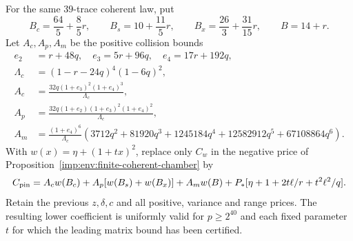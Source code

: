 \begin{proposition}
\label{imp:env:coherent-single-pin}
For the same $39$-trace coherent law, put
\[
 B_c=\frac{64}5+\frac85r,\qquad
 B_s=10+\frac{11}5r,\qquad
 B_x=\frac{26}3+\frac{31}{15}r,\qquad B=14+r.
\]
Let $A_c,A_p,A_m$ be the positive collision bounds
\[
\begin{split}
 e_2&=r+48q,\quad e_3=5r+96q,\quad e_4=17r+192q,\\
 \Lambda_c&=(1-r-24q)^4(1-6q)^2,\\
 A_c&=\frac{32q(1+e_3)^2(1+e_4)^3}{\Lambda_c},\\
 A_p&=\frac{32q(1+e_2)(1+e_3)^2(1+e_4)^2}{\Lambda_c},\\
 A_m&=\frac{(1+e_4)^6}{\Lambda_c}
 (3712q^2+81920q^3+1245184q^4+12582912q^5+67108864q^6).
\end{split}
\]
With $w(x)=\eta+(1+tx)^2$, replace only $C_w$ in the negative
price of Proposition~\ref{imp:env:finite-coherent-chamber} by
\[
 C_{\rm pin}=A_cw(B_c)+A_p[w(B_s)+w(B_x)]+A_mw(B)
 +P_*[\eta+1+2t\ell/r+t^2\ell^2/q].
\]
Retain the previous $z,\delta,c$ and all positive, variance and range
prices. The resulting lower coefficient is uniformly valid for
$p\ge2^{40}$ and each fixed parameter $t$ for which the leading matrix bound has been certified.
\end{proposition}

